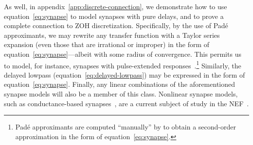 As well, in appendix~\ref{app:discrete-connection}, we demonstrate how to use equation~\ref{eq:synapse} to model synapses with pure delays, and to prove a complete connection to ZOH discretization.
Specifically, by the use of Pad\'e approximants, we may rewrite any transfer function with a Taylor series expansion (even those that are irrational or improper) in the form of equation~\ref{eq:synapse}---albeit with some radius of convergence.
This permits us to model, for instance, synapses with pulse-extended responses~\citep{voelker2017iscas}.\footnote{
Pad\'e approximants are computed ``manually'' by \citet[][equations~9--11]{voelker2017iscas} to obtain a second-order approximation in the form of equation~\ref{eq:synapse}.
}
Similarly, the delayed lowpass (equation~\ref{eq:delayed-lowpass}) may be expressed in the form of equation~\ref{eq:synapse}.
Finally, any linear combinations of the aforementioned synapse models will also be a member of this class.
Nonlinear synapse models, such as conductance-based synapses~\citep[e.g.,][equation~6]{destexhe1994efficient}, are a current subject of study in the NEF~\citep{stockel2017}.


